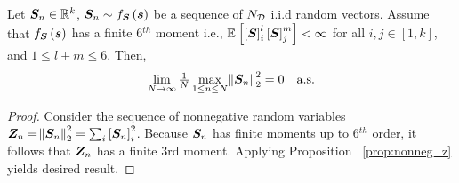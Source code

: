 \begin{corollary}
    Let $\randomvec{S}_n \in \mathbb{R}^k$, {$\randomvec{S}_n \sim \probt{\boldsymbol{s}}{\randomvec{s}} $} be a sequence of $N_{\mathcal{D}}$ {i.i.d} random vectors. Assume that 
    {
    $\probt{\boldsymbol{s}}{\randomvec{s}}$ has a finite 6$^{th}$ moment
    i.e., $\expectation{\squareb{\randomvec{S}}_i^l\squareb{\randomvec{S}}_j^m}{}<\infty$ 
    for all  $i,j\in[1,k]$, and $1 \leq l+m\leq 6$. 
    }  Then,
    \begin{equation*}
      \lim\limits_{N \rightarrow \infty }   \tfrac{1}{N}\max\limits_{1\leq n\leq N} \norm{\randomvec{S}_n}_2^2
        =0 \quad \text{a.s.}
    \end{equation*}
\end{corollary}
\begin{proof}
   Consider the sequence of nonnegative random variables $\randomvec{Z}_n=\norm{\randomvec{S}_n}^2_2=\sum_i\squareb{\randomvec{S}_n}_i^2$. 
   Because $\randomvec{S}_n$ has  finite moments up to 6$^{th}$ order,
   it follows that $\randomvec{Z}_n$ has a %
   finite 
   3rd moment. Applying Proposition ~\ref{prop:nonneg_z} yields desired result.  
\end{proof}



